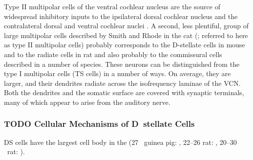 Type II multipolar cells of the ventral cochlear
 nucleus are the source of widespread inhibitory inputs
 to the ipsilateral dorsal cochlear nucleus and the
 contralateral dorsal and ventral cochlear nuclei \citep{CantBenson:2003}.
 A second, less plentiful, group of large multipolar cells
 described by Smith and Rhode in the cat (\citep*{SmithRhode:1989}; referred
 to here as type II multipolar cells) probably corresponds
 to the D-stellate cells in mouse \citep{Oertel:1983} and to the radiate
 cells in rat \citep{DoucetRyugoEtAl:1999} and also probably to the commissural cells
 described in a number of species.%
 These neurons can be distinguished from the type I multipolar cells (TS cells) in a number of ways. On average, they are
 larger, and their dendrites radiate across the isofrequency
 laminae of the VCN. %
Both the dendrites
 and the somatic surface are covered with synaptic terminals, many of which appear to arise from the auditory nerve.%


\subsubsection{TODO Cellular Mechanisms of D~stellate Cells}

DS cells have the largest cell body in the \VCN  (27 \um~guinea pig: \citep*{ArnottWallaceEtAl:2004},
22--26 \um rat: \citep*{DoucetRyugo:1997}, 20--30 \um~rat: \citep*{PaoliniClark:1999}). 



